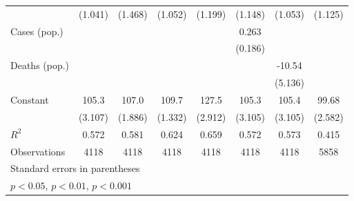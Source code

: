 \documentclass{article}
\begin{document}
{\begin{longtable}{l*{7}{c}}
                &  (1.041)         &  (1.468)         &  (1.052)         &  (1.199)         &  (1.148)         &  (1.053)         &  (1.125)         \\
Cases (pop.)    &                  &                  &                  &                  &    0.263         &                  &                  \\
                &                  &                  &                  &                  &  (0.186)         &                  &                  \\
Deaths (pop.)   &                  &                  &                  &                  &                  &   -10.54\sym{*}  &                  \\
                &                  &                  &                  &                  &                  &  (5.136)         &                  \\
Constant        &    105.3\sym{***}&    107.0\sym{***}&    109.7\sym{***}&    127.5\sym{***}&    105.3\sym{***}&    105.4\sym{***}&    99.68\sym{***}\\
                &  (3.107)         &  (1.886)         &  (1.332)         &  (2.912)         &  (3.105)         &  (3.105)         &  (2.582)         \\
\hline
\(R^{2}\)       &    0.572         &    0.581         &    0.624         &    0.659         &    0.572         &    0.573         &    0.415         \\
Observations    &     4118         &     4118         &     4118         &     4118         &     4118         &     4118         &     5858         \\
\hline\hline
\multicolumn{8}{l}{\footnotesize Standard errors in parentheses}\\
\multicolumn{8}{l}{\footnotesize \sym{*} \(p<0.05\), \sym{**} \(p<0.01\), \sym{***} \(p<0.001\)}\\
\end{longtable}
}
\end{document}
